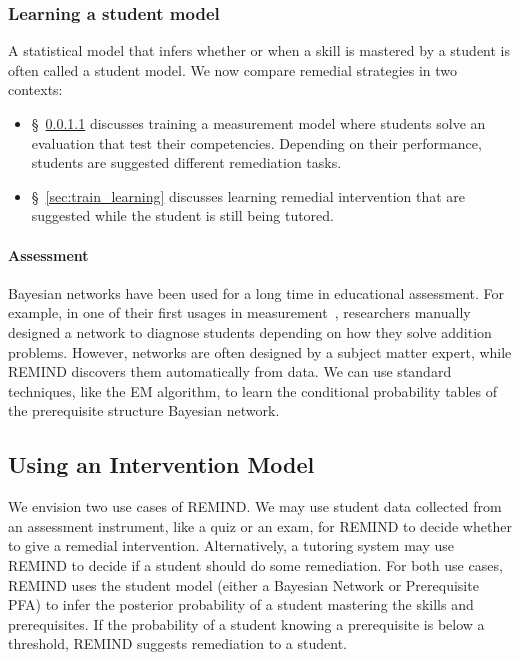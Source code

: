 \documentclass{edm_template}
\begin{document}
\subsubsection{Learning a student model}
A statistical model that infers whether or when a skill is mastered by a student is often called a student model.
We now compare remedial strategies in two contexts:
\begin{itemize}
	\item  \S~\ref{sec:train_assessment} discusses training a measurement model  where students  solve an evaluation that test their competencies.
	Depending on their performance, students are  suggested different remediation tasks.
	\item  \S~\ref{sec:train_learning}  discusses learning remedial intervention that are suggested while the student is still being tutored.
\end{itemize}

\paragraph{Assessment}
\label{sec:train_assessment}
Bayesian networks have been used for a long time in educational assessment.
For example, in one of their first usages in measurement~\cite{tatsuoka1983rule}, researchers manually designed a network to diagnose students depending on how they solve addition problems.
However, networks are often designed by a subject matter expert, while REMIND discovers them automatically from data.
We can use standard techniques, like the EM algorithm, to learn the conditional probability tables of the  prerequisite structure Bayesian network.

\subsection{Using an Intervention Model}
\label{sec:using_remind}
We envision two use cases of REMIND.
We may use student data collected from an assessment instrument, like a quiz or an exam, for REMIND to decide whether to give a remedial intervention.
Alternatively, a tutoring system may use REMIND to decide if a student should do some remediation.
For both use cases, REMIND uses the student model (either a Bayesian Network or Prerequisite PFA) to infer the posterior probability of a student mastering the skills and prerequisites.
If the probability of a student knowing a prerequisite is below a threshold, REMIND suggests  remediation to a student.
\end{document}
